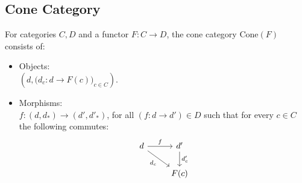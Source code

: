 \subsection{Cone Category}
\begin{definition}
  For categories $C, D$ and a functor $F:C\to D$, the cone category
  $\mathrm{Cone}(F)$ consists of: \parencite{fong_spivak:7sketches}

  \begin{itemize}
    \item Objects:\\
      $(d, \big(d_c: d \to F(c)\big)_{c\in C})$.
    \item Morphisms:\\
      $f: (d, d_*) \to (d', d'_*)$, for all $(f:d\to d')\in D$ such
      that for every $c\in C$ the following commutes:
      \[\begin{tikzcd}
        d & {d'} \\
        & {F(c)}
        \arrow["{d_c}"', from=1-1, to=2-2]
        \arrow["{d'_c}", from=1-2, to=2-2]
        \arrow["f", from=1-1, to=1-2]
      \end{tikzcd}\]
  \end{itemize}
\end{definition}
